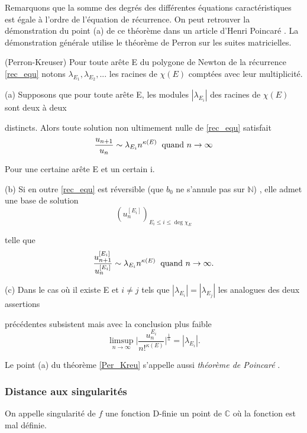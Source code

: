 \documentclass[a4paper,10pt]{article}
\begin{document}
	Remarquons que la somme des degrés des différentes équations caractéristiques est égale à l'ordre de l'équation de récurrence. On peut retrouver la démonstration du point (a) de ce théorème dans un article d'Henri Poincaré \cite{hp1885aj}. La démonstration générale utilise le théorème de Perron sur les suites matricielles.
	\begin{theorem} (Perron-Kreuser)
		Pour toute arête E du polygone de Newton de la récurrence \eqref{rec_equ} notons $\lambda_{E_{1}},\lambda_{E_{2}},...$ les racines de $\chi(E)$ comptées avec leur multiplicité.
		
		(a) Supposons que pour toute arête E, les modules $|\lambda_{E_{i}}|$ des racines de $\chi(E)$ sont deux à deux
		
		distincts. Alors toute solution non ultimement nulle de \eqref{rec_equ} satisfait
		\[\frac{u_{n+1}}{u_{n}}\sim \lambda_{E_{i}}n^{\kappa(E)} \hspace{2mm} \text{quand } n \rightarrow \infty\]
		
		Pour une certaine arête E et un certain i.
		
		(b) Si en outre \eqref{rec_equ} est réversible (que $b_0$ ne s'annule pas sur $\mathbb{N}$) , elle admet une base de solution 
		\[(u_{n}^{[E_{i}]})_{E_{i}\leq i \leq \deg \chi_{E}}\]
		
		telle que 
		\[\frac{u_{n+1}^{[E_{i}]}}{u_{n}^{[E_{i}]}}\sim \lambda_{E_{i}} n^{\kappa(E)} \hspace{2mm} \text{quand } n \rightarrow \infty.\]
		
		(c) Dans le cas où il existe E et $i \neq j$ tels que $|\lambda_{E_{i}}|=|\lambda_{E_{j}}|$ les analogues des deux assertions
		
		précédentes subsistent mais avec la conclusion plus faible
		\[\limsup_{n \rightarrow \infty } \big|\frac{u_{n}^{E_{i}}}{n!^{\kappa(E)}}\big|^{\frac{1}{n}}=|\lambda_{E_{i}}|.\]
		\label{Per_Kreu}
	\end{theorem}
	\noindent Le point (a) du théorème \ref{Per_Kreu} s'appelle aussi \textit{théorème de Poincaré} \cite{hp1885aj}. 
	
	\subsubsection{Distance aux singularités}
	\label{subsubsingularité}
	\begin{definition}
		On appelle singularité de $f$ une fonction D-finie un point de $\mathbb{C}$ où la fonction est mal définie.
	\end{definition}
	
\end{document}
